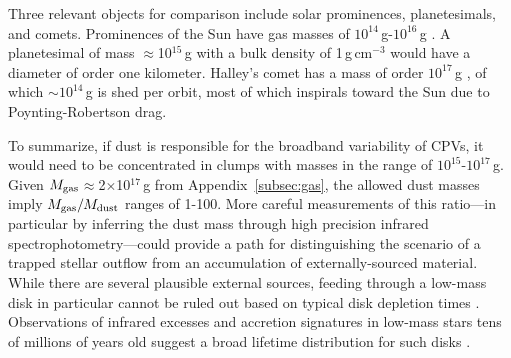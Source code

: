 \documentclass[11pt,twocolumn,tighten]{aastex7}
\begin{document}
Three relevant objects for comparison include solar prominences,
planetesimals, and comets.  Prominences of the Sun have gas masses of
$10^{14}$\,g-$10^{16}$\,g \citep{VialEngvold2015}.  A planetesimal of
mass $\approx$10$^{15}$\,g with a bulk density of 1\,g\,cm$^{-3}$
would have a diameter of order one kilometer.  Halley's comet has a
mass of order $10^{17}$\,g \citep{Rickman1989}, of which
$\sim$$10^{14}$\,g is shed per orbit, most of which inspirals toward
the Sun due to Poynting-Robertson drag.

To summarize, if dust is responsible for the broadband variability of
CPVs, it would need to be concentrated in clumps with masses in the
range of $10^{15}$-$10^{17}$\,g.  Given $M_{\rm
gas}$$\approx$2$\times$10$^{17}$\,g from Appendix~\ref{subsec:gas}, the
allowed dust masses imply $M_{\rm gas}/M_{\rm dust}$ ranges of 1-100.
More careful measurements of this ratio---in particular by inferring
the dust mass through high precision infrared
spectrophotometry---could provide a path for distinguishing the
scenario of a trapped stellar outflow from an accumulation of
externally-sourced material.  While there are several plausible
external sources, feeding through a low-mass disk in particular cannot
be ruled out based on typical disk depletion times \citep{Haisch2001}.
Observations of infrared excesses and accretion signatures in low-mass
stars tens of millions of years old suggest a broad lifetime
distribution for such disks
\citep{Silverberg2020,Lee2020,Gaidos2022,Pfalzner2024}.


\end{document}
